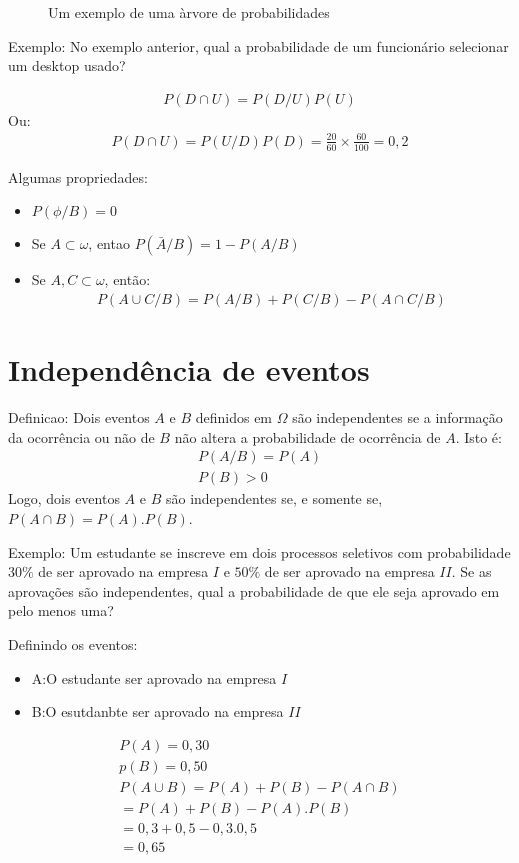 \documentclass[11pt,a4paper]{book}
\begin{document}
\begin{enumerate}[label=(\alph*)]
\begin{enumerate}
\begin{figure}
  \label{fig:16}
  \caption{Um exemplo de uma àrvore de probabilidades}
\end{figure}

Exemplo: No exemplo anterior, qual a probabilidade de um funcionário selecionar um 
desktop usado?
\begin{figure}
\end{figure}
\begin{align}
  P(D \cap U)= P(D/U)P(U)
\end{align}
Ou:
\begin{align}
  P(D \cap U)= P(U/D)P(D)= \frac{20}{60}\times \frac{60}{100}= 0,2
\end{align}

Algumas propriedades:
\begin{itemize}
  \item $P(\phi / B)=0$
  \item Se $A \subset \omega$, entao $P(\bar{A} / B)= 1-P(A/B)$
  \item Se $A,C \subset \omega$, então:
    \begin{align}
      P(A \cup C / B)= P(A/B)+ P(C/B) - P(A \cap C/B)
    \end{align}
\end{itemize}
\section{Independência de eventos}
Definicao: Dois eventos $A$ e $B$ definidos em $\Omega$ são independentes se 
a informação da ocorrência ou não de $B$ não altera a probabilidade de ocorrência
de $A$. Isto é:
\begin{align}
  P(A/B)= P(A) \\
  P(B)>0 
\end{align}
Logo, dois eventos $A$ e $B$ são independentes se, e somente se, $P(A \cap B)=P(A).P(B)$.

Exemplo: Um estudante se inscreve em dois processos seletivos com probabilidade 
$30\%$ de ser aprovado na empresa $I$ e $50\%$ de ser aprovado na empresa $II$. Se 
as aprovações são independentes, qual a probabilidade de que ele seja aprovado em
pelo menos uma?

Definindo os eventos:
\begin{itemize}
  \item A:\@ O estudante ser aprovado na empresa $I$
  \item B:\@ O esutdanbte ser aprovado na empresa $II$
\end{itemize}
\begin{align}
  P(A)= 0,30\\
  p(B)=0,50\\
  P(A\cup B)= P(A)+P(B)-P(A\cap B)\\
  =P(A)+P(B)-P(A).P(B)\\
  =0,3+0,5-0,3.0,5\\
  =0,65
\end{align}

\end{enumerate}
\end{enumerate}
\end{document}
